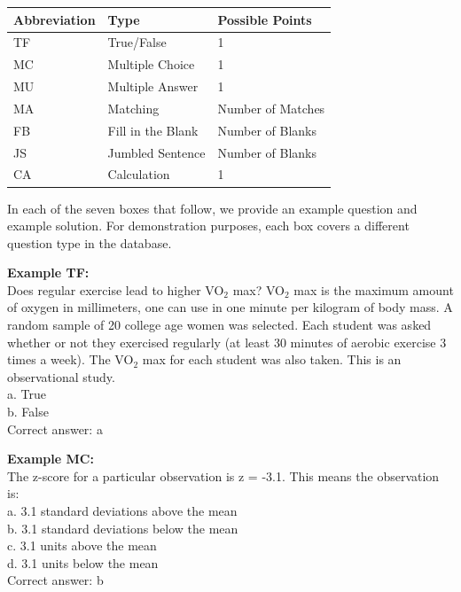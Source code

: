 \documentclass{article}\usepackage[]{graphicx}\usepackage[]{color}
\numberwithin{equation}{section} %
\begin{document}
\begin{center}
\label{tab:questionTypes}
\begin{tabular} { | l | l | l |}
\hline \textbf{Abbreviation} & \textbf{Type} & \textbf{Possible Points} \\
\hline
TF & True/False & 1 \\
\hline
MC & Multiple Choice & 1 \\
\hline
MU & Multiple Answer & 1 \\
\hline
MA & Matching & Number of Matches \\
\hline
FB & Fill in the Blank & Number of Blanks \\
\hline
JS & Jumbled Sentence & Number of Blanks \\
\hline
CA & Calculation & 1 \\
\hline
\end{tabular}
\end{center}

In each of the seven boxes that follow, we provide an example question and example solution. For demonstration purposes, each box covers a different question type in the database. \\

\begin{framed}
\textbf{Example TF:}\\

Does regular exercise lead to higher VO$_2$ max? VO$_2$ max is the maximum amount of oxygen in millimeters, one can use in one minute per kilogram of body mass. A random sample of 20 college age women was selected. Each student was asked whether or not they exercised regularly (at least 30 minutes of aerobic exercise 3 times a week). The VO$_2$ max for each student was also taken. This is an observational study.\\

a. True\\
b. False\\

Correct answer: a
\end{framed}

\begin{framed}
\textbf{Example MC:}\\

The z-score for a particular observation is z = -3.1. This means the observation is:\\

a. 3.1 standard deviations above the mean\\
b. 3.1 standard deviations below the mean\\
c. 3.1 units above the mean\\
d. 3.1 units below the mean\\

Correct answer: b
\end{framed}
\end{document}
